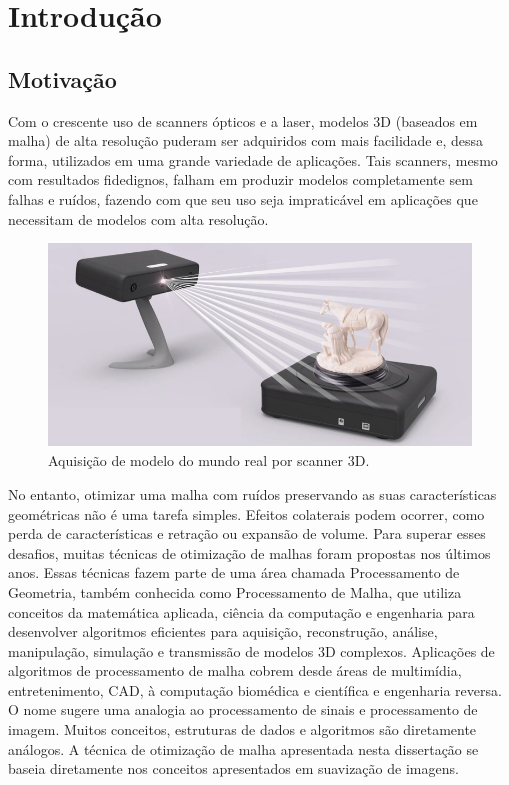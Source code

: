 \chapter{Introdução}
\label{cap:introducao}

\section{Motivação}
Com o crescente uso de scanners ópticos e a laser, modelos 3D (baseados em malha) de alta resolução puderam ser adquiridos com mais facilidade e, dessa forma, utilizados em uma grande variedade de aplicações. Tais scanners, mesmo com resultados fidedignos, falham em produzir modelos completamente sem falhas e ruídos, fazendo com que seu uso seja impraticável em aplicações que necessitam de modelos com alta resolução.
    
\begin{figure}[!ht]
\captionsetup{width=16cm}
\centering
\includegraphics[scale=0.6]{figuras/scan3d.jpg}
\caption{Aquisição de modelo do mundo real por scanner 3D.}
\label{fig:scan3d}
\end{figure}

No entanto, otimizar uma malha com ruídos preservando as suas características geométricas não é uma tarefa simples. Efeitos colaterais podem ocorrer, como perda de características e retração ou expansão de volume. Para superar esses desafios, muitas técnicas de otimização de malhas foram propostas nos últimos anos. Essas técnicas fazem parte de uma área chamada Processamento de Geometria, também conhecida como Processamento de Malha, que utiliza conceitos da matemática aplicada, ciência da computação e engenharia para desenvolver algoritmos eficientes para aquisição, reconstrução, análise, manipulação, simulação e transmissão de modelos 3D complexos. Aplicações de algoritmos de processamento de malha cobrem desde áreas de multimídia, entretenimento, CAD, à computação biomédica e científica e engenharia reversa. O nome sugere uma analogia ao processamento de sinais e processamento de imagem. Muitos conceitos, estruturas de dados e algoritmos são diretamente análogos. A técnica de otimização de malha apresentada nesta dissertação se baseia diretamente nos conceitos apresentados em suavização de imagens.

